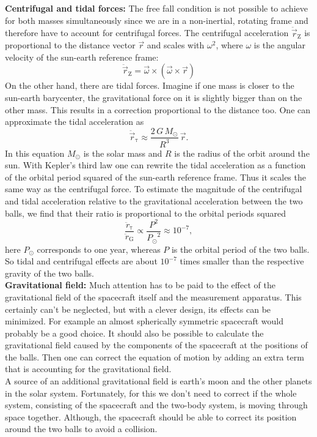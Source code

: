 \documentclass[prb,preprint]{revtex4-1}
\begin{document}
\textbf{Centrifugal and tidal forces:}
\label{sec:tidal}
The free fall condition is not possible to achieve for both masses simultaneously since we are in a non-inertial, rotating frame and therefore have to account for centrifugal forces. The centrifugal acceleration $\ddot{\vec{r}}_{\mathrm{Z}}$ is proportional to the distance vector $\vec{r}$ and scales with $\omega^2$, where $\omega$ is the angular velocity of the sun-earth reference frame:
\begin{equation}
\label{eq:centrifugalacc}
\ddot{\vec{r}}_{\mathrm{Z}} = \vec{\omega} \times \left( \vec{\omega} \times \vec{r} \right) 
\end{equation}
On the other hand, there are tidal forces. Imagine if one mass is closer to the sun-earth barycenter, the gravitational force on it is slightly bigger than on the other mass. This results in a correction proportional to the distance too. One can approximate the tidal acceleration as
\begin{equation}
\label{eq:tidalacc}
\ddot{\vec{r}}_{\mathrm{\tau}} \approx \frac{2 \, G \, M_\odot}{R^3} \, \vec{r}.
\end{equation}
In this equation $M_\odot$ is the solar mass and $R$ is the radius of the orbit around the sun. With Kepler's third law one can rewrite the tidal acceleration as a function of the orbital period squared of the sun-earth reference frame. Thus it scales the same way as the centrifugal force. To estimate the magnitude of the centrifugal and tidal acceleration relative to the gravitational acceleration between the two balls, we find that their ratio is proportional to the orbital periods squared
\begin{equation}\label{a_ratio}
\frac{\ddot{r}_{\mathrm{\tau}}}{\ddot{r}_\mathrm{G}} \propto \frac{P^2}{{P_\odot}^2} \approx 10^{-7},
\end{equation}
here $P_\odot$ corresponds to one year, whereas $P$ is the orbital period of the two balls. So tidal and centrifugal effects are about $10^{-7}$ times smaller than the respective gravity of the two balls.\\

\textbf{Gravitational field:}
Much attention has to be paid to the effect of the gravitational field of the spacecraft itself and the measurement apparatus. This certainly can't be neglected, but with a clever design, its effects can be minimized. For example an almost spherically symmetric spacecraft would probably be a good choice. It should also be possible to calculate the gravitational field caused by the components of the spacecraft at the positions of the balls. Then one can correct the equation of motion by adding an extra term that is accounting for the gravitational field. \\
A source of an additional gravitational field is earth's moon and the other planets in the solar system. Fortunately, for this we don't need to correct if the whole system, consisting of the spacecraft and the two-body system, is moving through space together. Although, the spacecraft should be able to correct its position around the two balls to avoid a collision.\\
\end{document}
